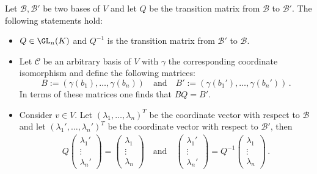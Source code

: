     \begin{property}\label{linalgebra:transition_matrix_properties}
        Let $\mathcal{B},\mathcal{B}'$ be two bases of $V$ and let $Q$ be the transition matrix from $\mathcal{B}$ to $\mathcal{B}'$. The following statements hold:
        \begin{itemize}
            \item $Q\in\GL_n(K)$ and $Q^{-1}$ is the transition matrix from $\mathcal{B}'$ to $\mathcal{B}$.
            \item Let $\mathcal{C}$ be an arbitrary basis of $V$ with $\gamma$ the corresponding coordinate isomorphism and define the following matrices: \[B:=(\gamma(b_1),\ldots,\gamma(b_n)) \quad\text{and}\quad B':=(\gamma(b_1'),\ldots,\gamma(b_n'))\,.\] In terms of these matrices one finds that $BQ = B'$.
            \item Consider $v\in V$. Let $(\lambda_1,\ldots,\lambda_n)^T$ be the coordinate vector with respect to $\mathcal{B}$ and let $(\lambda_1',\ldots,\lambda_n')^T$ be the coordinate vector with respect to $\mathcal{B}'$, then
                \begin{gather}
                    Q
                    \begin{pmatrix}
                        \lambda_1'\\\vdots\\\lambda_n'
                    \end{pmatrix}
                    =
                    \begin{pmatrix}
                        \lambda_1\\\vdots\\\lambda_n
                    \end{pmatrix}
                    \quad\text{and}\quad
                    \begin{pmatrix}
                        \lambda_1'\\\vdots\\\lambda_n'
                    \end{pmatrix}
                    = Q^{-1}
                    \begin{pmatrix}
                        \lambda_1\\\vdots\\\lambda_n
                    \end{pmatrix}\,.
                \end{gather}
        \end{itemize}
    \end{property}
